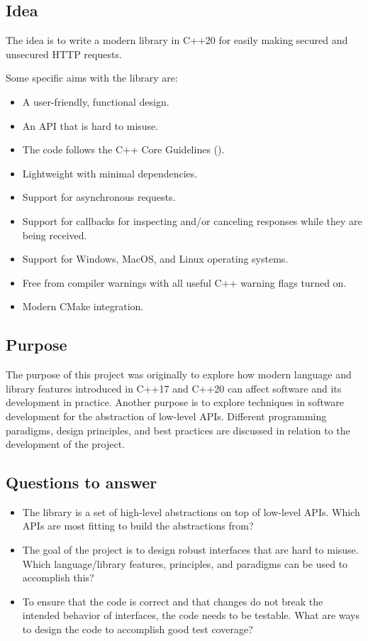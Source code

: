 \documentclass[12pt, a4paper]{article}
\begin{document}
\subsection{Idea}\label{sec:Idea}
The idea is to write a modern library in C++20 for easily making secured and unsecured HTTP requests. 

Some specific aims with the library are:
\begin{itemize}
	\item A user-friendly, functional design.
	\item An API that is hard to misuse.
	\item The code follows the C++ Core Guidelines (\cite{CppCoreGuidelines}).
	\item Lightweight with minimal dependencies.
	\item Support for asynchronous requests.
	\item Support for callbacks for inspecting and/or canceling responses while they are being received.
	\item Support for Windows, MacOS, and Linux operating systems.
	\item Free from compiler warnings with all useful C++ warning flags turned on.
	\item Modern CMake integration.
\end{itemize}

\subsection{Purpose}
The purpose of this project was originally to explore how modern language and library features introduced in C++17 and C++20 can affect software and its development in practice. Another purpose is to explore techniques in software development for the abstraction of low-level APIs. Different programming paradigms, design principles, and best practices are discussed in relation to the development of the project.
\subsection{Questions to answer}

\begin{itemize}
	\item The library is a set of high-level abstractions on top of low-level APIs. Which APIs are most fitting to build the abstractions from?
	\item The goal of the project is to design robust interfaces that are hard to misuse. Which language/library features, principles, and paradigms can be used to accomplish this?
	\item To ensure that the code is correct and that changes do not break the intended behavior of interfaces, the code needs to be testable. What are ways to design the code to accomplish good test coverage?
\end{itemize}
\end{document}
